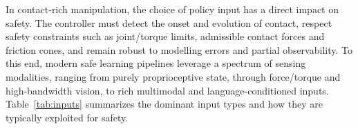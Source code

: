 \documentclass[Afour,sageh,times]{template/sagej}
\begin{document}



In contact-rich manipulation, the choice of policy input has a direct impact on safety. The controller must detect the onset and evolution of contact, respect safety constraints such as joint/torque limits, admissible contact forces and friction cones, and remain robust to modelling errors and partial observability. 
To this end, modern safe learning pipelines leverage a spectrum of sensing modalities, ranging from purely proprioceptive state, through force/torque and high-bandwidth vision, to rich multimodal and language-conditioned inputs. 
Table~\ref{tab:inputs} summarizes the dominant input types and how they are typically exploited for safety.
\end{document}
